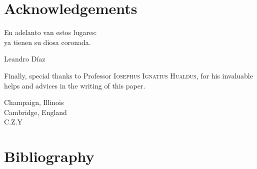 \documentclass{report}[12pt]
\begin{document}




\chapter{Acknowledgements}

\epigraph{En adelanto van estos lugares: \\ ya tienen su diosa coronada.}{Leandro Díaz}

Finally, special thanks to Professor \textsc{Iosephus Ignatius Hualdus}, for his invaluable helps and advices in the writing of this paper. 

\begin{flushright}
  Champaign, Illinois \\
  Cambridge, England \\
  C.Z.Y
\end{flushright}

\nocite{*}

\chapter*{Bibliography}

\printbibliography[heading=subbibintoc, keyword=phone, title={Phonology}]

\printbibliography[heading=subbibintoc, keyword=romance, title={Romance and Historical Linguistics}]

\printbibliography[heading=subbibintoc, keyword=tcs, title={Computation}]

\printbibliography[heading=subbibintoc, keyword=misc, title = {Misc.}]
\end{document}
